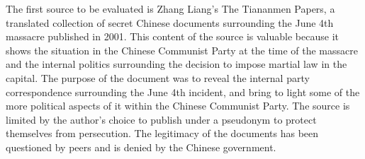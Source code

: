 \documentclass[../main.tex]{subfiles}
\begin{document}
The first source to be evaluated is Zhang Liang’s The Tiananmen Papers, a translated collection of secret Chinese documents surrounding the June 4th massacre published in 2001. This content of the source is valuable because it shows the situation in the Chinese Communist Party at the time of the massacre and the internal politics surrounding the decision to impose martial law in the capital. The purpose of the document was to reveal the internal party correspondence surrounding the June 4th incident, and bring to light some of the more political aspects of it within the Chinese Communist Party. The source is limited by the author’s choice to publish under a pseudonym to protect themselves from persecution. The legitimacy of the documents has been questioned by peers and is denied by the Chinese government.
\end{document}
